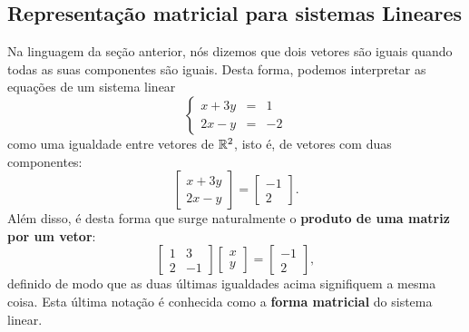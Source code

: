 \documentclass[../livro.tex]{subfiles}  %
\begin{document}
\subsection{Representação matricial para sistemas Lineares}

Na linguagem da seção anterior, nós dizemos que dois vetores são iguais quando todas as suas componentes são iguais. Desta forma, podemos interpretar as equações de um sistema linear
\begin{equation*}
  \left\{
    \begin{array}{rcl}
      x+3y&=&1 \\
      2x-y&=&-2
    \end{array}
  \right.
\end{equation*} como uma igualdade entre vetores de $\mathbb{R}^2$, isto é, de vetores com duas componentes:
\begin{equation*}
  \left[
    \begin{array}{c}
      x+3y \\
      2x-y
    \end{array}
  \right] =
    \left[
    \begin{array}{c}
      -1 \\
      2
    \end{array}
  \right].
\end{equation*} Além disso, é desta forma que surge naturalmente o \textbf{produto de uma matriz por um vetor}:
\begin{equation*}
  \left[
    \begin{array}{cc}
      1 & 3 \\
      2 & -1
    \end{array}
  \right]
  \left[
    \begin{array}{c}
      x \\
      y
    \end{array}
  \right] =
    \left[
    \begin{array}{c}
      -1 \\
      2
    \end{array}
  \right],
\end{equation*} definido de modo que as duas últimas igualdades acima signifiquem a mesma coisa. Esta última notação é conhecida como a \textbf{forma matricial} do sistema linear.
\end{document}
